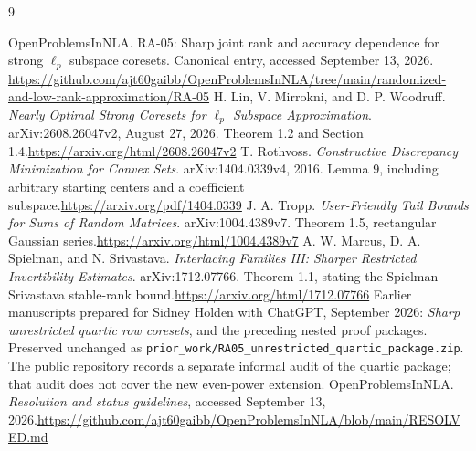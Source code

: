 \documentclass[11pt]{article}
\theoremstyle{remark}\newtheorem{remark}[theorem]{Remark}
\begin{document}
\clearpage
\begin{thebibliography}{9}\raggedright
{} OpenProblemsInNLA. RA-05: Sharp joint rank and accuracy dependence for strong $\ell_p$ subspace coresets. Canonical entry, accessed September 13, 2026.\newline
\url{https://github.com/ajt60gaibb/OpenProblemsInNLA/tree/main/randomized-and-low-rank-approximation/RA-05}
 H. Lin, V. Mirrokni, and D. P. Woodruff. \emph{Nearly Optimal Strong Coresets for $\ell_p$ Subspace Approximation}. arXiv:2608.26047v2, August 27, 2026. Theorem 1.2 and Section 1.4.\newline\url{https://arxiv.org/html/2608.26047v2}
 T. Rothvoss. \emph{Constructive Discrepancy Minimization for Convex Sets}. arXiv:1404.0339v4, 2016. Lemma 9, including arbitrary starting centers and a coefficient subspace.\newline\url{https://arxiv.org/pdf/1404.0339}
 J. A. Tropp. \emph{User-Friendly Tail Bounds for Sums of Random Matrices}. arXiv:1004.4389v7. Theorem 1.5, rectangular Gaussian series.\newline\url{https://arxiv.org/html/1004.4389v7}
 A. W. Marcus, D. A. Spielman, and N. Srivastava. \emph{Interlacing Families III: Sharper Restricted Invertibility Estimates}. arXiv:1712.07766. Theorem 1.1, stating the Spielman--Srivastava stable-rank bound.\newline\url{https://arxiv.org/html/1712.07766}
 Earlier manuscripts prepared for Sidney Holden with ChatGPT, September 2026: \emph{Sharp unrestricted quartic row coresets}, and the preceding nested proof packages. Preserved unchanged as \texttt{prior\_work/RA05\_unrestricted\_quartic\_package.zip}. The public repository records a separate informal audit of the quartic package; that audit does not cover the new even-power extension.
 OpenProblemsInNLA. \emph{Resolution and status guidelines}, accessed September 13, 2026.\newline\url{https://github.com/ajt60gaibb/OpenProblemsInNLA/blob/main/RESOLVED.md}
\end{thebibliography}
\end{document}
